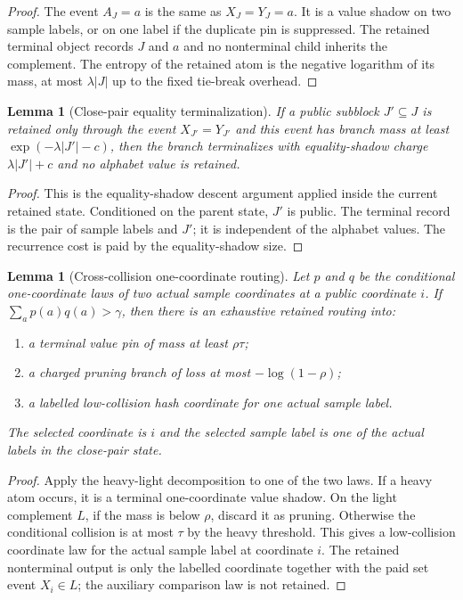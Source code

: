 \documentclass[11pt]{article}
\newtheorem{lemma}[theorem]{Lemma}
\theoremstyle{remark}
\begin{document}
\begin{proof}
The event $A_J=a$ is the same as $X_J=Y_J=a$.  It is a value shadow on two sample labels, or on one label if the duplicate pin is suppressed.  The retained terminal object records $J$ and $a$ and no nonterminal child inherits the complement.  The entropy of the retained atom is the negative logarithm of its mass, at most $\lambda |J|$ up to the fixed tie-break overhead.
\end{proof}

\begin{lemma}[Close-pair equality terminalization]\label{lem:app-equality-terminal}
If a public subblock $J'\subseteq J$ is retained only through the event $X_{J'}=Y_{J'}$ and this event has branch mass at least $\exp(-\lambda |J'|-c)$, then the branch terminalizes with equality-shadow charge $\lambda |J'|+c$ and no alphabet value is retained.
\end{lemma}

\begin{proof}
This is the equality-shadow descent argument applied inside the current retained state.  Conditioned on the parent state, $J'$ is public.  The terminal record is the pair of sample labels and $J'$; it is independent of the alphabet values.  The recurrence cost is paid by the equality-shadow size.
\end{proof}

\begin{lemma}[Cross-collision one-coordinate routing]\label{lem:app-cross-collision}
Let $p$ and $q$ be the conditional one-coordinate laws of two actual sample coordinates at a public coordinate $i$.  If $\sum_a p(a)q(a)>\gamma$, then there is an exhaustive retained routing into:
\begin{enumerate}[label=\textup{(\roman*)}]
\item a terminal value pin of mass at least $\rho\tau$;
\item a charged pruning branch of loss at most $-\log(1-\rho)$;
\item a labelled low-collision hash coordinate for one actual sample label.
\end{enumerate}
The selected coordinate is $i$ and the selected sample label is one of the actual labels in the close-pair state.
\end{lemma}

\begin{proof}
Apply the heavy-light decomposition to one of the two laws.  If a heavy atom occurs, it is a terminal one-coordinate value shadow.  On the light complement $L$, if the mass is below $\rho$, discard it as pruning.  Otherwise the conditional collision is at most $\tau$ by the heavy threshold.  This gives a low-collision coordinate law for the actual sample label at coordinate $i$.  The retained nonterminal output is only the labelled coordinate together with the paid set event $X_i\in L$; the auxiliary comparison law is not retained.
\end{proof}
\end{document}
